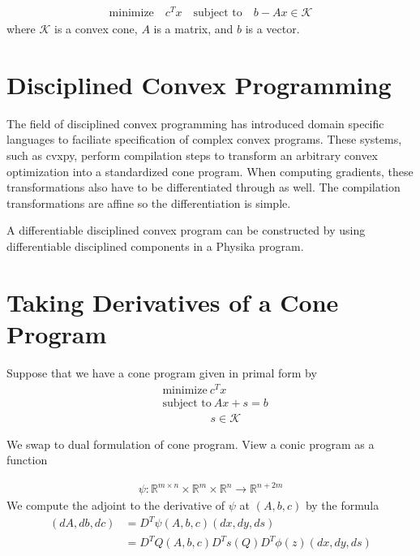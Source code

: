 \documentclass[book.tex]{subfiles}
\begin{document}
\begin{align}
\textrm{minimize} \quad c^T x \quad
\textrm{subject to} \quad b - A x \in \mathcal{K}
\end{align}
where $\mathcal{K}$ is a convex cone, $A$ is a matrix, and $b$ is a vector.


\section{Disciplined Convex Programming}
The field of disciplined convex programming has introduced domain specific languages to faciliate specification of complex convex programs. These systems, such as cvxpy, perform compilation steps to transform an arbitrary convex optimization into a standardized cone program. When computing gradients, these transformations also have to be differentiated through as well. The compilation transformations are affine so the differentiation is simple.

A differentiable disciplined convex program can be constructed by using differentiable disciplined components in a Physika program.

\section{Taking Derivatives of a Cone Program}

Suppose that we have a cone program given in primal form by
\begin{align}
    &\textrm{minimize}\ c^T x \\
    & \textrm{subject to}\ Ax + s = b \\
    & \qquad \qquad \ s \in \mathcal{K}
\end{align}

We swap to dual formulation of cone program. View a conic program as a function

\begin{align}
    \psi: \mathbb{R}^{m \times n}\times \mathbb{R}^m \times \mathbb{R}^n \to \mathbb{R}^{n+2m}
\end{align}
We compute the adjoint to the derivative of $\psi$ at $(A, b, c)$ by the formula
\begin{align}
    (dA, db, dc) &= D^T \psi(A, b, c)(dx, dy, ds) \\
    &= D^T Q(A, b, c)D^T s(Q) D^T \phi(z)(dx, dy, ds)
\end{align}
\end{document}
